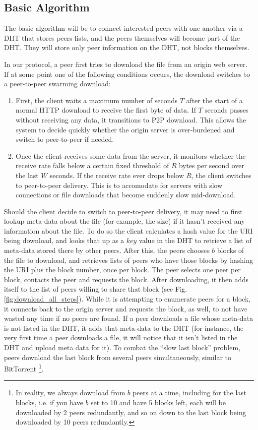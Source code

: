 \subsection{Basic Algorithm}

The basic algorithm will be to connect interested peers with one another via a DHT that stores peers lists, and the peers themselves will become part of the DHT.  They will store only peer information on the DHT, not blocks themselves.

In our protocol, a peer first tries to download the file from an origin web server.  If at some point one of the following conditions occurs, the download switches to a peer-to-peer swarming download:
\begin{enumerate}
\item First, the client waits a maximum number of seconds $T$ after the start of a normal HTTP download to receive the first byte of data.  If $T$ seconds passes without receiving any data, it transitions to P2P download.  This allows the system to decide quickly whether the origin server is over-burdened and switch to peer-to-peer if needed.   
\item Once the client receives some data from the server, it monitors whether the receive rate falls below a certain fixed threshold of $R$ bytes per second over the last $W$ seconds.  If the receive rate ever drops below $R$, the client switches to peer-to-peer delivery.  This is to accomodate for servers with slow connections or file downloads that become suddenly slow mid-download.
\end{enumerate}

Should the client decide to switch to peer-to-peer delivery, it may need to first lookup meta-data about the file (for example, the size) if it hasn't received any information about the file.  To do so the client calculates a hash value for the URI being download, and looks that up as a $key$ value in the DHT to retrieve a list of meta-data stored there by other peers.  After this, the peers chooses $b$ blocks of the file to download, and retrieves lists of peers who have those blocks by hashing the URI plus the block number, once per block.  The peer selects one peer per block, contacts the peer and requests the block.  After downloading, it then adds itself to the list of peers willing to share that block (see Fig. \ref{fig:download_all_steps}).  While it is attempting to enumerate peers for a block, it connects back to the origin server and requests the block, as well, to not have wasted any time if no peers are found.  If a peer downloads a file whose meta-data is not listed in the DHT, it adds that meta-data to the DHT (for instance, the very first time a peer downloads a file, it will notice that it isn't listed in the DHT and upload meta data for it).  To combat the ``slow last block'' problem,  peers download the last block from several peers simultaneously, similar to BitTorrent \footnote{In reality, we always download from $b$ peers at a time, including for the last blocks, i.e. if you have $b$ set to 10 and have 5 blocks left, each will be downloaded by 2 peers redundantly, and so on down to the last block being downloaded by 10 peers redundantly.}.

